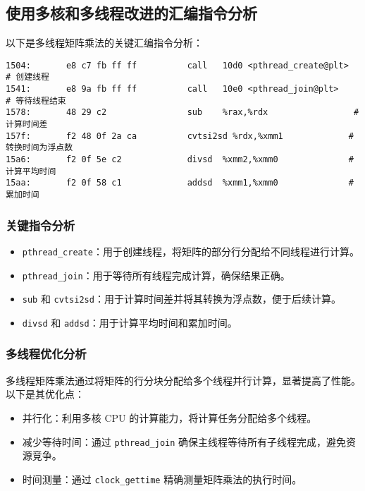 \documentclass[a4paper,12pt]{ctexart}
\begin{document}
\subsection{使用多核和多线程改进的汇编指令分析}
以下是多线程矩阵乘法的关键汇编指令分析：

\begin{lstlisting}[caption={多线程矩阵乘法的关键汇编指令}]
1504:       e8 c7 fb ff ff          call   10d0 <pthread_create@plt>  # 创建线程
1541:       e8 9a fb ff ff          call   10e0 <pthread_join@plt>    # 等待线程结束
1578:       48 29 c2                sub    %rax,%rdx                 # 计算时间差
157f:       f2 48 0f 2a ca          cvtsi2sd %rdx,%xmm1             # 转换时间为浮点数
15a6:       f2 0f 5e c2             divsd  %xmm2,%xmm0              # 计算平均时间
15aa:       f2 0f 58 c1             addsd  %xmm1,%xmm0              # 累加时间
\end{lstlisting}

\subsubsection{关键指令分析}
\begin{itemize}
    \item \texttt{pthread\_create}：用于创建线程，将矩阵的部分行分配给不同线程进行计算。
    \item \texttt{pthread\_join}：用于等待所有线程完成计算，确保结果正确。
    \item \texttt{sub} 和 \texttt{cvtsi2sd}：用于计算时间差并将其转换为浮点数，便于后续计算。
    \item \texttt{divsd} 和 \texttt{addsd}：用于计算平均时间和累加时间。
\end{itemize}

\subsubsection{多线程优化分析}
多线程矩阵乘法通过将矩阵的行分块分配给多个线程并行计算，显著提高了性能。以下是其优化点：
\begin{itemize}
    \item 并行化：利用多核 CPU 的计算能力，将计算任务分配给多个线程。
    \item 减少等待时间：通过 \texttt{pthread\_join} 确保主线程等待所有子线程完成，避免资源竞争。
    \item 时间测量：通过 \texttt{clock\_gettime} 精确测量矩阵乘法的执行时间。
\end{itemize}
\end{document}
